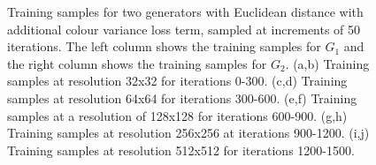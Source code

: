 \begin{figure}[!htbp]
    \hfill
    \hfill
    \hfill
    \hfill
    \hfill
    \caption[Training samples for two generators with Euclidean distance with additional colour variance loss term]{Training samples for two generators with Euclidean distance with additional colour variance loss term, sampled at increments of 50 iterations. The left column shows the training samples for $G_{1}$ and the right column shows the training samples for $G_{2}$. (a,b) Training samples at resolution 32x32 for iterations 0-300. (c,d) Training samples at resolution 64x64 for iterations 300-600. (e,f) Training samples at a resolution of 128x128 for iterations 600-900. (g,h) Training samples at resolution 256x256 at iterations 900-1200. (i,j) Training samples at resolution 512x512 for iterations 1200-1500.}
    \label{fig:c3:samples-euclid-euclid}
  \end{figure}

